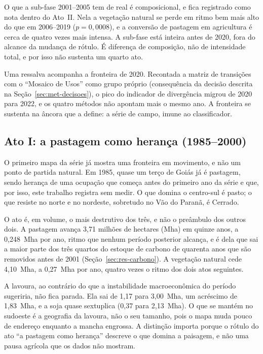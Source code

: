 O que a sub-fase 2001--2005 tem de real é composicional, e fica registrado
como nota dentro do Ato~II. Nela a vegetação natural se perde em ritmo bem
mais alto do que em 2006--2019 ($p = 0{,}0008$), e a conversão de pastagem em
agricultura é cerca de quatro vezes mais intensa. A sub-fase está inteira
antes de 2020, fora do alcance da mudança de rótulo. É diferença de
composição, não de intensidade total, e por isso não sustenta um quarto ato.

Uma ressalva acompanha a fronteira de 2020. Recontada a matriz de transições
com o ``Mosaico de Usos'' como grupo próprio (consequência da decisão descrita
na Seção~\ref{sec:met-decisoes}), o pico do indicador de divergência migrou de
2020 para 2022, e os quatro métodos não apontam mais o mesmo ano. A fronteira
se sustenta na âncora que a define: a série de campo, imune ao classificador.

\subsection{Ato I: a pastagem como herança (1985--2000)}

O primeiro mapa da série já mostra uma fronteira em movimento, e não um
ponto de partida natural. Em 1985, quase um terço de Goiás já é pastagem, sendo
herança de uma ocupação que começa antes do primeiro ano da série e que,
por isso, este trabalho registra sem medir. O que domina o centro-sul é pasto; o que resiste no norte
e no nordeste, sobretudo no Vão do Paranã, é Cerrado.

O ato é, em volume, o mais destrutivo dos três, e não o preâmbulo dos outros
dois. A pastagem avança 3,71 milhões de hectares (Mha) em quinze anos, a
0,248~Mha por ano, ritmo
que nenhum período posterior alcança, e é dela que sai a maior parte dos três
quartos do estoque de carbono de quarenta anos que são removidos antes de 2001
(Seção~\ref{sec:res-carbono}). A vegetação natural cede 4,10~Mha, a 0,27~Mha por
ano, quatro vezes o ritmo dos dois atos seguintes.

A lavoura, ao contrário do que a instabilidade macroeconômica do período
sugeriria, não fica parada. Ela sai de 1,17 para 3,00~Mha, um acréscimo de
1,83~Mha, e a soja quase sextuplica (0,37 para 2,13~Mha). O que se mantém no
sudoeste é a geografia da lavoura, não o seu tamanho, pois o mapa muda pouco
de endereço enquanto a mancha engrossa. A distinção importa porque o rótulo do
ato ``a pastagem como herança'' descreve o que domina a paisagem, e não
uma pausa agrícola que os dados não mostram.

